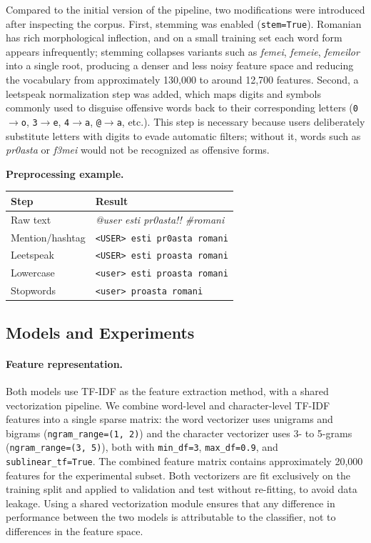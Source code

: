 Compared to the initial version of the pipeline, two modifications were introduced after inspecting the corpus. First, stemming was enabled (\texttt{stem=True}). Romanian has rich morphological inflection, and on a small training set each word form appears infrequently; stemming collapses variants such as \textit{femei}, \textit{femeie}, \textit{femeilor} into a single root, producing a denser and less noisy feature space and reducing the vocabulary from approximately 130,000 to around 12,700 features. Second, a leetspeak normalization step was added, which maps digits and symbols commonly used to disguise offensive words back to their corresponding letters (\texttt{0}$\to$\texttt{o}, \texttt{3}$\to$\texttt{e}, \texttt{4}$\to$\texttt{a}, \texttt{@}$\to$\texttt{a}, etc.). This step is necessary because users deliberately substitute letters with digits to evade automatic filters; without it, words such as \textit{pr0asta} or \textit{f3mei} would not be recognized as offensive forms.


\noindent\textbf{Preprocessing example.}
\begin{center}
\footnotesize
\begin{tabularx}{\columnwidth}{@{}p{}X@{}}
\toprule
Step & Result \\
\midrule
Raw text & \textit{@user esti pr0asta!! \#romani} \\
Mention/hashtag & \texttt{<USER> esti pr0asta romani} \\
Leetspeak & \texttt{<USER> esti proasta romani} \\
Lowercase & \texttt{<user> esti proasta romani} \\
Stopwords & \texttt{<user> proasta romani} \\
\bottomrule
\end{tabularx}
\end{center}


\subsection{Models and Experiments}
\label{subsec:models_experiments}

\paragraph{Feature representation.}
Both models use TF-IDF as the feature extraction method, with a shared vectorization pipeline. We combine word-level and character-level TF-IDF features into a single sparse matrix: the word vectorizer uses unigrams and bigrams (\texttt{ngram\_range=(1,\,2)}) and the character vectorizer uses 3- to 5-grams (\texttt{ngram\_range=(3,\,5)}), both with \texttt{min\_df=3}, \texttt{max\_df=0.9}, and \texttt{sublinear\_tf=True}. The combined feature matrix contains approximately 20,000 features for the experimental subset. Both vectorizers are fit exclusively on the training split and applied to validation and test without re-fitting, to avoid data leakage. Using a shared vectorization module ensures that any difference in performance between the two models is attributable to the classifier, not to differences in the feature space.

